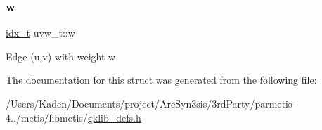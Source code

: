 \mbox{\label{a00710_ad8b9f1185850e05876ee066a461c0d9d}} 
\subsubsection{\texorpdfstring{w}{w}}
{\footnotesize\ttfamily \hyperlink{a00876_aaa5262be3e700770163401acb0150f52}{idx\+\_\+t} uvw\+\_\+t\+::w}

Edge (u,v) with weight w 

The documentation for this struct was generated from the following file\+:\begin{DoxyCompactItemize}
\item 
/\+Users/\+Kaden/\+Documents/project/\+Arc\+Syn3sis/3rd\+Party/parmetis-\/4../metis/libmetis/\hyperlink{a00209}{gklib\+\_\+defs.\+h}\end{DoxyCompactItemize}

